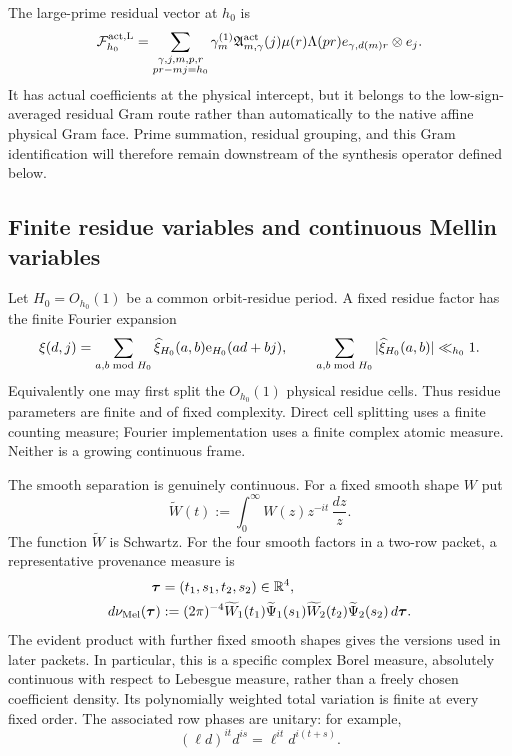 The large-prime residual vector at $h_0$ is
\begin{equation}
 \mathcal F_{h_0}^{\rm act,L}
 =\sum_{\substack{\gamma,j,m,p,r\\pr-mj=h_0}}
 \gamma_m^{(1)}\mathfrak A_{m,\gamma}^{\rm act}(j)
 \mu(r)\Lambda(pr)e_{\gamma,d(m)r}\otimes e_j.
 \label{eq:tpc51-physical-residual}
\end{equation}
It has actual coefficients at the physical intercept, but it belongs to the
low-sign-averaged residual Gram route rather than automatically to the native
affine physical Gram face.  Prime summation, residual grouping, and this Gram
identification will therefore remain downstream of the synthesis operator
defined below.

\subsection{Finite residue variables and continuous Mellin variables}

Let $H_0=O_{h_0}(1)$ be a common orbit-residue period.  A fixed residue
factor has the finite Fourier expansion
\begin{equation}
 \xi(d,j)
 =\sum_{a,b\bmod H_0}
   \widehat\xi_{H_0}(a,b)\mathrm e_{H_0}(ad+bj),
 \qquad
 \sum_{a,b\bmod H_0}|\widehat\xi_{H_0}(a,b)|\ll_{h_0}1.
 \label{eq:tpc51-finite-residue-Fourier}
\end{equation}
Equivalently one may first split the $O_{h_0}(1)$ physical residue cells.
Thus residue parameters are finite and of fixed complexity.  Direct cell
splitting uses a finite counting measure; Fourier implementation uses a
finite complex atomic measure.  Neither is a growing continuous frame.

The smooth separation is genuinely continuous.  For a fixed smooth shape
$W$ put
\begin{equation}
 \widetilde W(t)
 :=\int_0^\infty W(z)z^{-it}\,\frac{dz}{z}.
 \label{eq:tpc51-Mellin-transform}
\end{equation}
The function $\widetilde W$ is Schwartz.  For the four smooth factors in a
two-row packet, a representative provenance measure is
\begin{equation}
 \begin{split}
 \bm\tau&=(t_1,s_1,t_2,s_2)\in\mathbb R^4,\\
 d\nu_{\rm Mel}(\bm\tau)
 &:=(2\pi)^{-4}
   \widetilde W_1(t_1)\widetilde\Psi_1(s_1)
   \widetilde W_2(t_2)\widetilde\Psi_2(s_2)\,d\bm\tau.
 \end{split}
 \label{eq:tpc51-provenance-Mellin-measure}
\end{equation}
The evident product with further fixed smooth shapes gives the versions used
in later packets.  In particular, this is a specific complex Borel measure,
absolutely continuous with respect to Lebesgue measure, rather than a freely
chosen coefficient density.  Its polynomially weighted total variation is
finite at every fixed order.  The associated row phases are unitary: for
example,
\begin{equation}
 (\ell d)^{it}d^{is}=\ell^{it}d^{i(t+s)}.
 \label{eq:tpc51-unit-Mellin-row-phase}
\end{equation}

